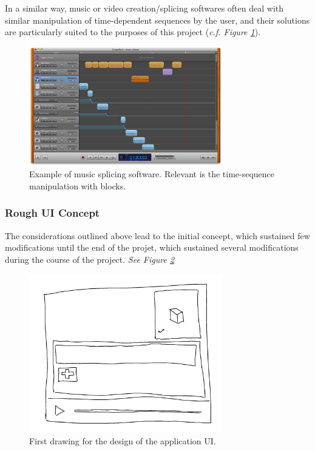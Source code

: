 In a similar way, music or video creation/splicing softwares often deal with similar manipulation of time-dependent sequences by the user, and their solutions are particularly suited to the purposes of this project (\textit{c.f. Figure \ref{img:MusicEditor}}).\\

\begin{figure}[ht]
   \centering
   \includegraphics[width=0.75\textwidth]{img/MusicEditor.png}
   \caption{Example of music splicing software. Relevant is the time-sequence manipulation with blocks.}
   \label{img:MusicEditor}
\end{figure}


\subsubsection{Rough UI Concept}

The considerations outlined above lead to the initial concept, which sustained few modifications until the end of the projet, which sustained several modifications during the course of the project.
\textit{See Figure \ref{img:AppConcept}}

\begin{figure}[ht]
   \centering
   \includegraphics[width=0.75\textwidth]{img/AppConcept.png}
   \caption{First drawing for the design of the application UI.}
   \label{img:AppConcept}
\end{figure}

